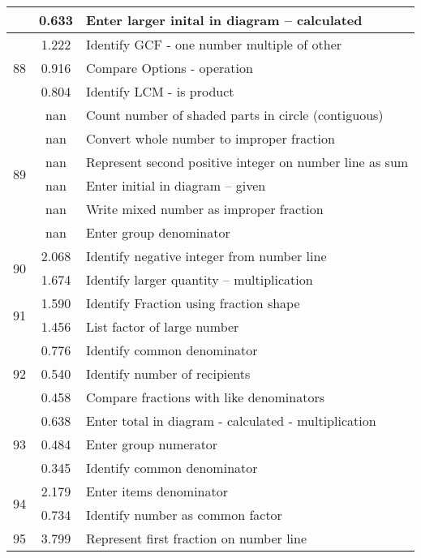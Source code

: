 \begin{longtable}[c]{|c|c|l|}
 & \small 0.633 & \small Enter larger inital in diagram -- calculated \\
\hline
\multirow{3}{*}{\small 88} & \small 1.222 & \small Identify GCF - one number multiple of other \\
 & \small 0.916 & \small Compare Options - operation \\
 & \small 0.804 & \small Identify LCM - is product \\
\hline
\multirow{6}{*}{\small 89} & \small nan & \small Count number of shaded parts in circle (contiguous) \\
 & \small nan & \small Convert whole number to improper fraction \\
 & \small nan & \small Represent second positive integer on number line as sum \\
 & \small nan & \small Enter initial in diagram -- given \\
 & \small nan & \small Write mixed number as improper fraction \\
 & \small nan & \small Enter group denominator \\
\hline
\multirow{2}{*}{\small 90} & \small 2.068 & \small Identify negative integer from number line \\
 & \small 1.674 & \small Identify larger quantity -- multiplication \\
\hline
\multirow{2}{*}{\small 91} & \small 1.590 & \small Identify Fraction using fraction shape \\
 & \small 1.456 & \small List factor of large number \\
\hline
\multirow{3}{*}{\small 92} & \small 0.776 & \small Identify common denominator \\
 & \small 0.540 & \small Identify number of recipients \\
 & \small 0.458 & \small Compare fractions with like denominators \\
\hline
\multirow{3}{*}{\small 93} & \small 0.638 & \small Enter total in diagram - calculated - multiplication \\
 & \small 0.484 & \small Enter group numerator \\
 & \small 0.345 & \small Identify common denominator \\
\hline
\multirow{2}{*}{\small 94} & \small 2.179 & \small Enter items denominator \\
 & \small 0.734 & \small Identify number as common factor \\
\hline
\multirow{1}{*}{\small 95} & \small 3.799 & \small Represent first fraction on number line \\

\end{longtable}
